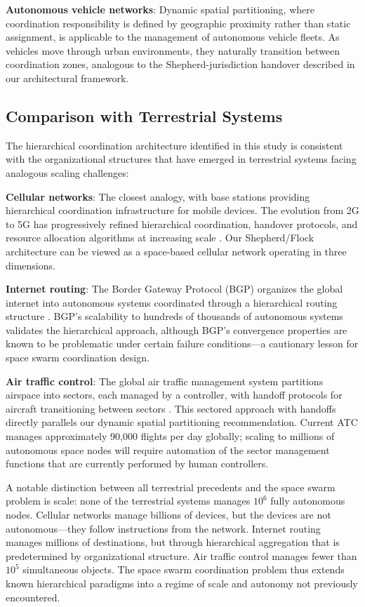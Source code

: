 \documentclass[journal]{IEEEtran}
\begin{document}
\textbf{Autonomous vehicle networks}: Dynamic spatial partitioning, where coordination responsibility is defined by geographic proximity rather than static assignment, is applicable to the management of autonomous vehicle fleets. As vehicles move through urban environments, they naturally transition between coordination zones, analogous to the Shepherd-jurisdiction handover described in our architectural framework.

\subsection{Comparison with Terrestrial Systems}

The hierarchical coordination architecture identified in this study is consistent with the organizational structures that have emerged in terrestrial systems facing analogous scaling challenges:

\textbf{Cellular networks}: The closest analogy, with base stations providing hierarchical coordination infrastructure for mobile devices. The evolution from 2G to 5G has progressively refined hierarchical coordination, handover protocols, and resource allocation algorithms at increasing scale \cite{rappaport_wireless}. Our Shepherd/Flock architecture can be viewed as a space-based cellular network operating in three dimensions.

\textbf{Internet routing}: The Border Gateway Protocol (BGP) organizes the global internet into autonomous systems coordinated through a hierarchical routing structure \cite{rekhter_bgp}. BGP's scalability to hundreds of thousands of autonomous systems validates the hierarchical approach, although BGP's convergence properties are known to be problematic under certain failure conditions---a cautionary lesson for space swarm coordination design.

\textbf{Air traffic control}: The global air traffic management system partitions airspace into sectors, each managed by a controller, with handoff protocols for aircraft transitioning between sectors \cite{icao_atm}. This sectored approach with handoffs directly parallels our dynamic spatial partitioning recommendation. Current ATC manages approximately 90{,}000 flights per day globally; scaling to millions of autonomous space nodes will require automation of the sector management functions that are currently performed by human controllers.

A notable distinction between all terrestrial precedents and the space swarm problem is scale: none of the terrestrial systems manages $10^6$ fully autonomous nodes. Cellular networks manage billions of devices, but the devices are not autonomous---they follow instructions from the network. Internet routing manages millions of destinations, but through hierarchical aggregation that is predetermined by organizational structure. Air traffic control manages fewer than $10^5$ simultaneous objects. The space swarm coordination problem thus extends known hierarchical paradigms into a regime of scale and autonomy not previously encountered.
\end{document}
